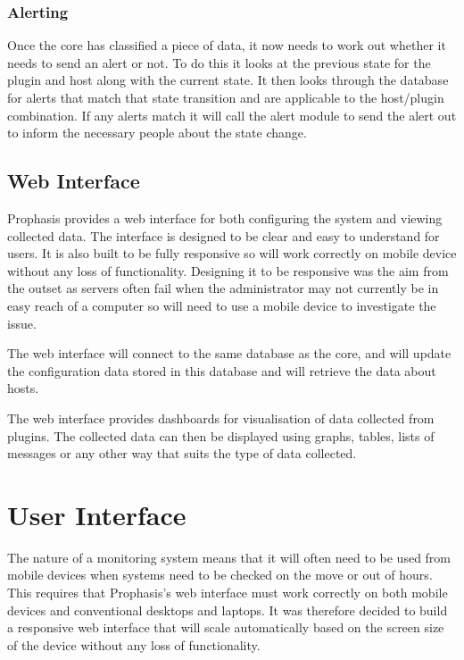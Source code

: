 \documentclass[bsc,logo,twoside,parskip,singlespacing,notimes]{infthesis}
\begin{document}
\subsubsection{Alerting}

	Once the core has classified a piece of data, it now needs to work out
	whether it needs to send an alert or not.  To do this it looks at the previous
	state for the plugin and host along with the current state.  It then looks
	through the database for alerts that match that state transition and are
	applicable to the host/plugin combination.  If any alerts match it will call
	the alert module to send the alert out to inform the necessary people about the
	state change.

\subsection{Web Interface}

	Prophasis provides a web interface for both configuring the system and viewing
	collected data.  The interface is designed to be clear and easy to understand
	for users.  It is also built to be fully responsive so will work correctly on
	mobile device without any loss of functionality.  Designing it to be responsive
	was the aim from the outset as servers often fail when the administrator may
	not currently be in easy reach of a computer so will need to use a mobile
	device to investigate the issue.


	The web interface will connect to the same database as the core, and will
	update the configuration data stored in this database and will retrieve
	the data about hosts.


	The web interface provides dashboards for visualisation of data collected from
	plugins.  The collected data can then be displayed using graphs, tables, lists
	of messages or any other way that suits the type of data collected.

\section{User Interface}

	The nature of a monitoring system means that it will often need to be used from
	mobile devices when systems need to be checked on the move or out of hours. This
	requires that Prophasis's web interface must work correctly on both mobile devices
	and conventional desktops and laptops.  It was therefore decided to build a
	responsive web interface that will scale automatically based on the screen size
	of the device without any loss of functionality.
\end{document}
